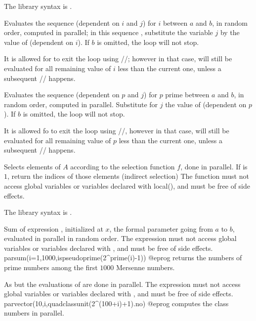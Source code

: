 {The library syntax is .

\label{se:parfor}
Evaluates the sequence  (dependent on $i$ and $j$) for $i$
between $a$ and $b$, in random order, computed in parallel; in this sequence
, substitute the variable $j$ by the value of 
(dependent on $i$). If $b$ is omitted, the loop will not stop.

It is allowed for  to exit the loop using
//; however in that case,  will
still be evaluated for all remaining value of $i$ less than the current one,
unless a subsequent // happens.

\label{se:parforprime}
Evaluates the sequence  (dependent on $p$ and $j$) for $p$
prime between $a$ and $b$, in random order, computed in parallel. Substitute
for $j$ the value of  (dependent on $p$).
If $b$ is omitted, the loop will not stop.

It is allowed fo  to exit the loop using
//, however in that case,  will
still be evaluated for all remaining value of $p$ less than the current one,
unless a subsequent // happens.

\label{se:parselect}
Selects elements of $A$ according to the selection function $f$, done in
parallel.  If \fl is $1$, return the indices of those elements (indirect
selection) The function  must not access global variables or
variables declared with local(), and must be free of side effects.

The library syntax is .

\label{se:parsum}
Sum of expression , initialized at $x$, the formal parameter
going from $a$ to $b$, evaluated in parallel in random order.
The expression  must not access global variables or
variables declared with , and must be free of side effects.
\bprog
parsum(i=1,1000,ispseudoprime(2^prime(i)-1))
@eprog
returns the numbers of prime numbers among the first $1000$ Mersenne numbers.

\label{se:parvector}
As  but the evaluations of  are done in
parallel. The expression  must not access global variables or
variables declared with , and must be free of side effects.
\bprog
parvector(10,i,quadclassunit(2^(100+i)+1).no)
@eprog\noindent
computes the class numbers in parallel.

}
